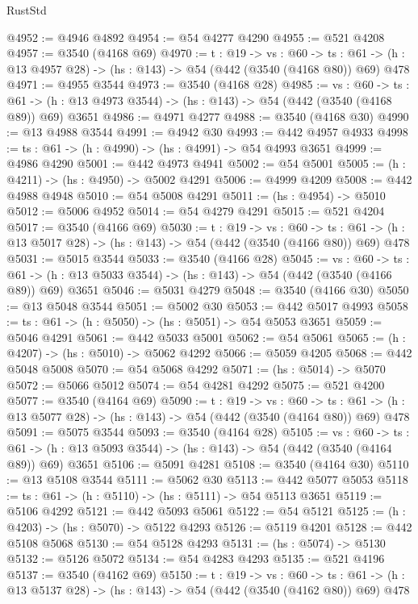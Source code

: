 \begin{lexlean}{RustStd}
\begin{coremodule}
@4952 := @4946 @4892
@4954 := @54 @4277 @4290
@4955 := @521 @4208
@4957 := @3540 (@4168 @69)
@4970 := {t : @19} ->
  {vs : @60} ->
  {ts : @61} -> (h : @13 @4957 @28) -> (hs : @143) -> @54 (@442 (@3540 (@4168 @80)) @69) @478
@4971 := @4955 @3544
@4973 := @3540 (@4168 @28)
@4985 := {vs : @60} ->
  {ts : @61} -> (h : @13 @4973 @3544) -> (hs : @143) -> @54 (@442 (@3540 (@4168 @89)) @69) @3651
@4986 := @4971 @4277
@4988 := @3540 (@4168 @30)
@4990 := @13 @4988 @3544
@4991 := @4942 @30
@4993 := @442 @4957 @4933
@4998 := {ts : @61} -> (h : @4990) -> (hs : @4991) -> @54 @4993 @3651
@4999 := @4986 @4290
@5001 := @442 @4973 @4941
@5002 := @54 @5001
@5005 := (h : @4211) -> (hs : @4950) -> @5002 @4291
@5006 := @4999 @4209
@5008 := @442 @4988 @4948
@5010 := @54 @5008 @4291
@5011 := (hs : @4954) -> @5010
@5012 := @5006 @4952
@5014 := @54 @4279 @4291
@5015 := @521 @4204
@5017 := @3540 (@4166 @69)
@5030 := {t : @19} ->
  {vs : @60} ->
  {ts : @61} -> (h : @13 @5017 @28) -> (hs : @143) -> @54 (@442 (@3540 (@4166 @80)) @69) @478
@5031 := @5015 @3544
@5033 := @3540 (@4166 @28)
@5045 := {vs : @60} ->
  {ts : @61} -> (h : @13 @5033 @3544) -> (hs : @143) -> @54 (@442 (@3540 (@4166 @89)) @69) @3651
@5046 := @5031 @4279
@5048 := @3540 (@4166 @30)
@5050 := @13 @5048 @3544
@5051 := @5002 @30
@5053 := @442 @5017 @4993
@5058 := {ts : @61} -> (h : @5050) -> (hs : @5051) -> @54 @5053 @3651
@5059 := @5046 @4291
@5061 := @442 @5033 @5001
@5062 := @54 @5061
@5065 := (h : @4207) -> (hs : @5010) -> @5062 @4292
@5066 := @5059 @4205
@5068 := @442 @5048 @5008
@5070 := @54 @5068 @4292
@5071 := (hs : @5014) -> @5070
@5072 := @5066 @5012
@5074 := @54 @4281 @4292
@5075 := @521 @4200
@5077 := @3540 (@4164 @69)
@5090 := {t : @19} ->
  {vs : @60} ->
  {ts : @61} -> (h : @13 @5077 @28) -> (hs : @143) -> @54 (@442 (@3540 (@4164 @80)) @69) @478
@5091 := @5075 @3544
@5093 := @3540 (@4164 @28)
@5105 := {vs : @60} ->
  {ts : @61} -> (h : @13 @5093 @3544) -> (hs : @143) -> @54 (@442 (@3540 (@4164 @89)) @69) @3651
@5106 := @5091 @4281
@5108 := @3540 (@4164 @30)
@5110 := @13 @5108 @3544
@5111 := @5062 @30
@5113 := @442 @5077 @5053
@5118 := {ts : @61} -> (h : @5110) -> (hs : @5111) -> @54 @5113 @3651
@5119 := @5106 @4292
@5121 := @442 @5093 @5061
@5122 := @54 @5121
@5125 := (h : @4203) -> (hs : @5070) -> @5122 @4293
@5126 := @5119 @4201
@5128 := @442 @5108 @5068
@5130 := @54 @5128 @4293
@5131 := (hs : @5074) -> @5130
@5132 := @5126 @5072
@5134 := @54 @4283 @4293
@5135 := @521 @4196
@5137 := @3540 (@4162 @69)
@5150 := {t : @19} ->
  {vs : @60} ->
  {ts : @61} -> (h : @13 @5137 @28) -> (hs : @143) -> @54 (@442 (@3540 (@4162 @80)) @69) @478

\end{coremodule}
\end{lexlean}
